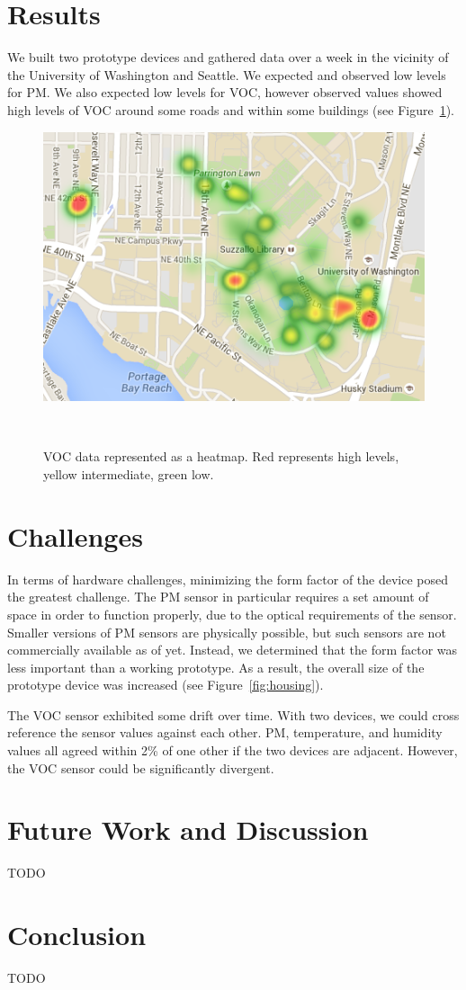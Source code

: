 \documentclass{sigchi}
\begin{document}
\section{Results}
We built two prototype devices and gathered data over a week in the vicinity of the University of Washington and Seattle.
We expected and observed low levels for PM.
We also expected low levels for VOC, however observed values showed high levels of VOC around some roads and within some buildings (see Figure~\ref{fig:voc heatmap}).
\begin{figure}
    \centering
    \includegraphics[width=0.9\columnwidth]{figures/VOC-Heatmap.png}
    \caption{VOC data represented as a heatmap.  Red represents high levels, yellow intermediate, green low.}
    ~\label{fig:voc heatmap}
\end{figure}

\section{Challenges}
In terms of hardware challenges, minimizing the form factor of the device posed the greatest challenge.
The PM sensor in particular requires a set amount of space in order to function properly, due to the optical requirements of the sensor.
Smaller versions of PM sensors are physically possible\cite{PMSensor:Article}, but such sensors are not commercially available as of yet.
Instead, we determined that the form factor was less important than a working prototype.
As a result, the overall size of the prototype device was increased (see Figure~\ref{fig:housing}).

The VOC sensor exhibited some drift over time.
With two devices, we could cross reference the sensor values against each other.
PM, temperature, and humidity values all agreed within 2\% of one other if the two devices are adjacent.
However, the VOC sensor could be significantly divergent.

\section{Future Work and Discussion}
TODO

\section{Conclusion}
TODO

\balance{}



\end{document}
